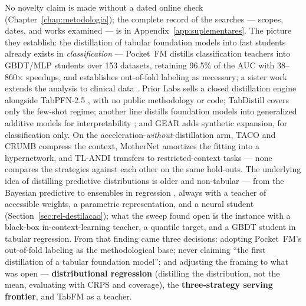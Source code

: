 No novelty claim is made without a dated online check
(Chapter~\ref{chap:metodologia}); the complete record of the
searches --- scopes, dates, and works examined --- is in
Appendix~\ref{app:suplementares}. The picture they establish: the
distillation of tabular foundation models into fast students already
exists in \emph{classification} --- Pocket~FM \citep{pocketfm2026}
distills classification teachers into GBDT/MLP students over 153
datasets, retaining 96.5\% of the AUC with 38--860$\times$ speedups,
and establishes out-of-fold labeling as necessary; a sister work
extends the analysis to clinical data \citep{pocketfmhealth2026}.
Prior Labs sells a closed distillation engine alongside TabPFN-2.5
\citep{priorlabs2025}, with no public methodology or code;
TabDistill \citep{tabdistill2025} covers only the few-shot regime;
another line distills foundation models into generalized additive
models for interpretability \citep{tfmgam2026}; and GEAR
\citep{gear2026} adds synthetic expansion, for classification only.
On the acceleration-\emph{without}-distillation arm, TACO
\citep{taco2026} and CRUMB \citep{crumb2026} compress the context,
MotherNet \citep{mothernet2023} amortizes the fitting into a
hypernetwork, and TL-ANDI \citep{tlandi2026} transfers to
restricted-context tasks --- none compares the strategies against
each other on the same hold-outs. The underlying idea of distilling
predictive distributions is older and non-tabular --- from the
Bayesian predictive \citep{korattikara2015} to ensembles in
regression \citep{malinin2020rpn}, always with a teacher of
accessible weights, a parametric representation, and a neural
student (Section~\ref{sec:rel-destilacao}); what the sweep found
open is the instance with a black-box in-context-learning teacher, a
quantile target, and a GBDT student in tabular regression. From that
finding came three decisions: adopting Pocket~FM's out-of-fold
labeling as the methodological base; never claiming ``the first
distillation of a tabular foundation model''; and adjusting the
framing to what was open --- \textbf{distributional regression}
(distilling the distribution, not the mean, evaluating with CRPS and
coverage), the \textbf{three-strategy serving frontier}, and
TabFM as a teacher.

